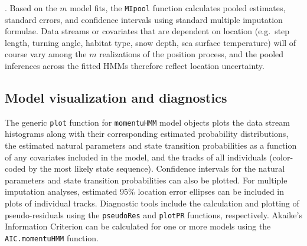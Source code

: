 \documentclass[12pt]{article}\usepackage[]{graphicx}\usepackage[]{color}
\begin{document}
. Based on the $m$ model fits, the \verb|MIpool| function calculates pooled estimates, standard errors, and confidence intervals %
using standard multiple imputation formulae. %
Data streams or covariates that are dependent on location (e.g.\ step length, turning angle, habitat type, snow depth, sea surface temperature) will of course vary among the $m$ realizations of the position process, and the pooled inferences across the fitted HMMs therefore reflect location uncertainty. %

\subsection{Model visualization and diagnostics}
The generic \verb|plot| function for \verb|momentuHMM| model objects plots the data stream histograms along with their corresponding estimated probability distributions, the estimated natural parameters and state transition probabilities as a function of any covariates included in the model, and the tracks of all individuals (color-coded by the most likely state sequence). %
Confidence intervals for the natural parameters and state transition probabilities can also be plotted. %
For multiple imputation analyses, estimated 95\% location error ellipses can be included in plots of individual tracks. %
Diagnostic tools include the calculation and plotting of pseudo-residuals \citep{ZucchiniEtAl2016} using the \verb|pseudoRes| and \verb|plotPR| functions, respectively. %
Akaike's Information Criterion can be calculated for one or more models using the \verb|AIC.momentuHMM| function.
\end{document}
